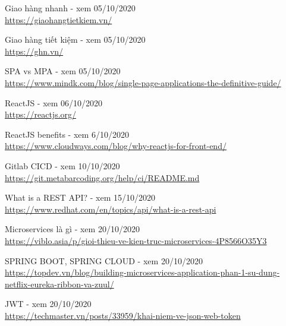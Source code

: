 \documentclass[12pt,a4paper,oneside]{book}
\begin{document}
	\frontmatter
	
	
	

	\tableofcontents
	\listoffigures
	\newpage
	
	\mainmatter
	
	
	
    
    
    
    
    
    
    \begin{thebibliography}{80}
        
         Giao hàng nhanh - xem 05/10/2020\\
        \url{https://giaohangtietkiem.vn/}
        
         Giao hàng tiết kiệm - xem 05/10/2020\\
        \url{https://ghn.vn/}
    
         SPA vs MPA - xem 05/10/2020\\
        \url{https://www.mindk.com/blog/single-page-applications-the-definitive-guide/}
        
         ReactJS - xem 06/10/2020\\
        \url{https://reactjs.org/}
    
         ReactJS benefits - xem 6/10/2020\\
        \url{https://www.cloudways.com/blog/why-reactjs-for-front-end/}
    
         Gitlab CICD - xem 10/10/2020\\
        \url{https://git.metabarcoding.org/help/ci/README.md}    
        
         What is a REST API? - xem 15/10/2020\\
        \url{https://www.redhat.com/en/topics/api/what-is-a-rest-api} 
          
         Microservices là gì - xem 20/10/2020\\
        \url{https://viblo.asia/p/gioi-thieu-ve-kien-truc-microservices-4P8566O35Y3} 
        
         SPRING BOOT, SPRING CLOUD - xem 20/10/2020\\
        \url{https://topdev.vn/blog/building-microservices-application-phan-1-su-dung-netflix-eureka-ribbon-va-zuul/}
        
         JWT - xem 20/10/2020\\
        \url{https://techmaster.vn/posts/33959/khai-niem-ve-json-web-token}
        

\end{thebibliography}
\end{document}
